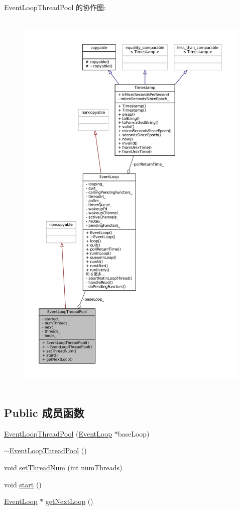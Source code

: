 Event\+Loop\+Thread\+Pool 的协作图\+:
\nopagebreak
\begin{figure}[H]
\begin{center}
\leavevmode
\includegraphics[height=550pt]{classmuduo_1_1EventLoopThreadPool__coll__graph}
\end{center}
\end{figure}
\subsection*{Public 成员函数}
\begin{DoxyCompactItemize}
\item 
\hyperlink{classmuduo_1_1EventLoopThreadPool_ab1abd52cc351211b66982ad02e306ac6}{Event\+Loop\+Thread\+Pool} (\hyperlink{classmuduo_1_1EventLoop}{Event\+Loop} $\ast$base\+Loop)
\item 
\hyperlink{classmuduo_1_1EventLoopThreadPool_a009ff3f40b47ffa7ff8ed249e4be9864}{$\sim$\+Event\+Loop\+Thread\+Pool} ()
\item 
void \hyperlink{classmuduo_1_1EventLoopThreadPool_a83bb28d139df96ba9fc449b4643f2c36}{set\+Thread\+Num} (int num\+Threads)
\item 
void \hyperlink{classmuduo_1_1EventLoopThreadPool_a60de64d75454385b23995437f1d72669}{start} ()
\item 
\hyperlink{classmuduo_1_1EventLoop}{Event\+Loop} $\ast$ \hyperlink{classmuduo_1_1EventLoopThreadPool_ad79a4dd0cdd1358bfde1170759543c7d}{get\+Next\+Loop} ()
\end{DoxyCompactItemize}
